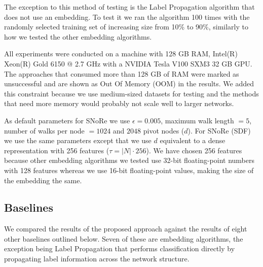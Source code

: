 \documentclass[twoside,11pt]{article}
\begin{document}
The exception to this method of testing is the Label Propagation algorithm that does not use an embedding. To test it we ran the algorithm 100 times with the randomly selected training set of increasing size from 10\% to 90\%, similarly to how we tested the other embedding algorithms.

All experiments were conducted on a machine with 128 GB RAM, Intel(R) Xeon(R) Gold 6150 @ 2.7 GHz with a NVIDIA Tesla V100 SXM3 32 GB GPU. The approaches that consumed more than 128 GB of RAM were marked as unsuccessful and are shown as Out Of Memory (OOM) in the results. We added this constraint because we use medium-sized datasets for testing and the methods that need more memory would probably not scale well to larger networks.

As default parameters for SNoRe we use $\epsilon = 0.005$, maximum walk length $=5$, number of walks per node $= 1024$ and $2048$ pivot nodes ($d$). For SNoRe (SDF) we use the same parameters except that we use $d$ equivalent to a dense representation with 256 features ($\tau = |N|\cdot 256$). We have chosen 256 features because other embedding algorithms we tested use 32-bit floating-point numbers with 128 features whereas we use 16-bit floating-point values, making the size of the embedding the same.

\subsection{Baselines}
We compared the results of the proposed approach against the results of eight other baselines outlined below. Seven of these are embedding algorithms, the exception being Label Propagation that performs classification directly by propagating label information across the network structure.
\end{document}
